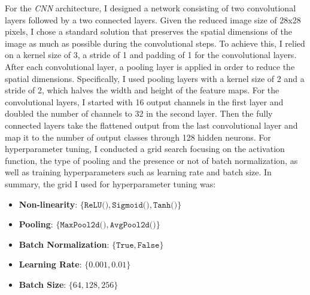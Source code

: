 For the \emph{CNN} architecture, I designed a network consisting of two convolutional layers followed by a two connected layers. Given the 
reduced image size of 28x28 pixels, I chose a standard solution that preserves the spatial dimensions of the image as much as possible during 
the convolutional steps. To achieve this, I relied on a kernel size of 3, a stride of 1 and padding of 1 for the convolutional layers. 
After each convolutional layer, a pooling layer is applied in order to reduce the spatial dimensions. Specifically, I used pooling layers 
with a kernel size of 2 and a stride of 2, which halves the width and height of the feature maps. For the convolutional layers, I started 
with 16 output channels in the first layer and doubled the number of channels to 32 in the second layer. Then the fully connected layers take 
the flattened output from the last convolutional layer and map it to the number of output classes through 128 hidden neurons. For hyperparameter 
tuning, I conducted a grid search focusing on the activation function, the type of pooling and the presence or not of batch normalization, 
as well as training hyperparameters such as learning rate and batch size. In summary, the grid I used for hyperparameter tuning was:

\begin{itemize} 
    \item \textbf{Non-linearity}: $\{\texttt{ReLU()}, \texttt{Sigmoid()}, \texttt{Tanh()}\}$ 
    \item \textbf{Pooling}: $\{\texttt{MaxPool2d()}, \texttt{AvgPool2d()}\}$ 
    \item \textbf{Batch Normalization}: $\{\texttt{True}, \texttt{False}\}$ 
    \item \textbf{Learning Rate}: $\{0.001, 0.01\}$ 
    \item \textbf{Batch Size}: $\{64, 128, 256\}$ 
\end{itemize}

